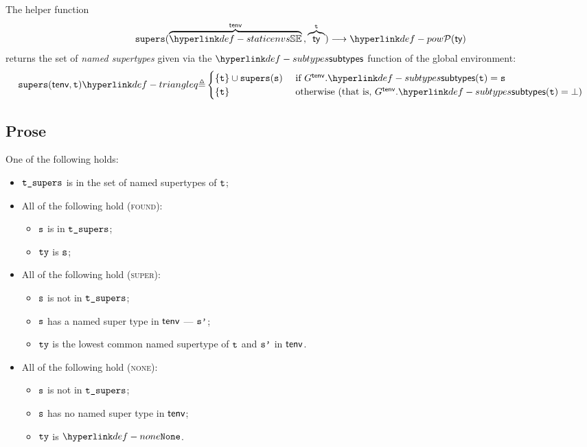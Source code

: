 \documentclass{book}
\begin{document}
\newcommand\supers[0]{\texttt{supers}}
The helper function
\[
  \supers(\overname{\staticenvs}{\tenv} \aslsep \overname{\ty}{\vt})
  \aslto \pow{\ty}
\]
returns the set of \emph{named supertypes} given via the $\subtypes$ function of the global environment:
\[
  \supers(\tenv, \vt) \triangleq
  \begin{cases}
    \{\vt\} \cup \supers(\vs) & \text{ if }G^\tenv.\subtypes(\vt) = \vs\\
    \{\vt\}  & \text{ otherwise } (\text{that is, }G^\tenv.\subtypes(\vt) = \bot)\\
  \end{cases}
\]

\subsection{Prose}
One of the following holds:
\begin{itemize}
  \item $\texttt{t\_supers}$ is in the set of named supertypes of $\texttt{t}$;
  \item All of the following hold (\textsc{found}):
  \begin{itemize}
    \item $\texttt{s}$ is in $\texttt{t\_supers}$;
    \item $\texttt{ty}$ is $\texttt{s}$;
  \end{itemize}

  \item All of the following hold (\textsc{super}):
  \begin{itemize}
    \item $\texttt{s}$ is not in $\texttt{t\_supers}$;
    \item $\texttt{s}$ has a named super type in $\textsf{tenv}$ --- $\texttt{s'}$;
    \item $\texttt{ty}$ is the lowest common named supertype of $\texttt{t}$ and $\texttt{s'}$ in $\textsf{tenv}$.
  \end{itemize}

  \item All of the following hold (\textsc{none}):
  \begin{itemize}
    \item $\texttt{s}$ is not in $\texttt{t\_supers}$;
    \item $\texttt{s}$ has no named super type in $\textsf{tenv}$;
    \item $\texttt{ty}$ is $\None$.
  \end{itemize}
\end{itemize}
\end{document}
